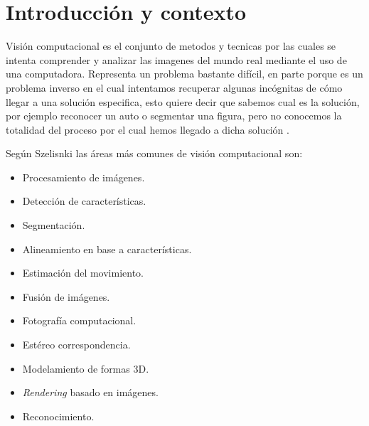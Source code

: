 \chapter{Introducción y contexto}\label{chap:Intro}



Visión computacional es el conjunto de metodos y tecnicas por las cuales se intenta comprender y analizar las imagenes del mundo real mediante el uso de una computadora.
Representa un problema bastante difícil, en parte porque es un problema inverso en el cual intentamos recuperar algunas incógnitas de cómo llegar a una solución especifica, esto quiere decir que sabemos cual es la solución, por ejemplo reconocer un auto o segmentar una figura, pero no conocemos la totalidad del proceso por el cual hemos llegado a dicha solución \cite{szeliski2010computer}. 

Según Szelisnki \cite{szeliski2010computer} las áreas más comunes de visión computacional son: 
\begin{itemize}
\item Procesamiento de imágenes.
\item Detección de características.
\item Segmentación.
\item Alineamiento en base a características.
\item Estimación del movimiento.
\item Fusión de imágenes.
\item Fotografía computacional.
\item Estéreo correspondencia.
\item Modelamiento de formas 3D.
\item \textit{Rendering} basado en imágenes.
\item Reconocimiento.
\end{itemize}

